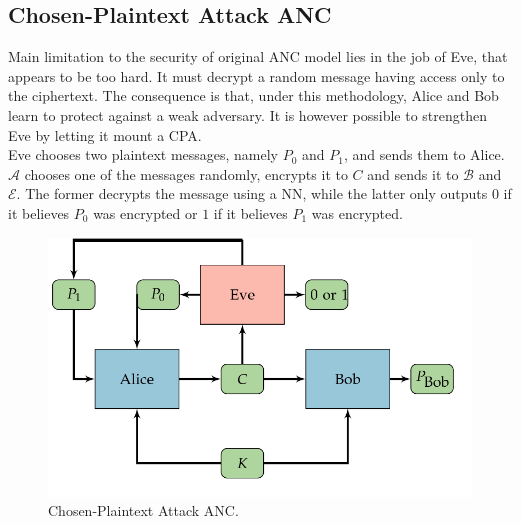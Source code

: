 \documentclass[%
    corpo=11pt,
    twoside,
    stile=classica,
    oldstyle,
    autoretitolo,
    tipotesi=magistrale,
    greek,
    evenboxes,
    english
]{toptesi}
\begin{document}
\subsection{Chosen-Plaintext Attack ANC}
\label{cpaanc}
Main limitation to the security of original ANC model lies in the job of Eve, that appears to be too hard. It must decrypt a random message having access only to the ciphertext. The consequence is that, under this methodology, Alice and Bob learn to protect against a weak adversary. It is however possible to strengthen Eve by letting it mount a CPA.  \\
Eve chooses two plaintext messages, namely $P_0$ and $P_1$, and sends them to Alice. $\mathcal{A}$ chooses one of the messages randomly, encrypts it to $C$ and sends it to $\mathcal{B}$ and $\mathcal{E}$. The former decrypts the message using a NN, while the latter only outputs $0$ if it believes $P_0$ was encrypted or $1$ if it believes $P_1$ was encrypted. \\
\begin{figure}[h]
\centering
\includegraphics[scale = 0.4]{pictures/cpa-anc.png}
\caption{Chosen-Plaintext Attack ANC.}
\label{fig:cpaanc}
\end{figure}
\end{document}
